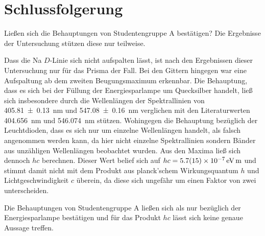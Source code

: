 \section{Schlussfolgerung}
	
	Ließen sich die Behauptungen von Studentengruppe A bestätigen?
	Die Ergebnisse der Untersuchung stützen diese nur teilweise.
	
	Dass die Na $D$-Linie sich nicht aufspalten lässt, ist nach den Ergebnissen dieser Untersuchung nur für das Prisma der Fall.
	Bei den Gittern hingegen war eine Aufspaltung ab dem zweiten Beugungsmaximum erkennbar.
	Die Behauptung, dass es sich bei der Füllung der Energiesparlampe um Quecksilber handelt, ließ sich insbesondere durch die Wellenlängen der Spektrallinien von \SI{405.81+-0.13}{\nano\meter} und \SI{547.08+-0.16}{\nano\meter} verglichen mit den Literaturwerten \SI{404.656}{\nano\meter} und \SI{546.074}{\nano\meter}\cite{NISTHg} stützen.
	Wohingegen die Behauptung bezüglich der Leuchtdioden, dass es sich nur um einzelne Wellenlängen handelt, als falsch angenommen werden kann, da hier nicht einzelne Spektrallinien sondern Bänder aus unzähligen Wellenlängen beobachtet wurden. 
	Aus den Maxima ließ sich dennoch $hc$ berechnen.
	Dieser Wert belief sich auf $hc = \SI{5,7+-1,5e-7}{\electronvolt\meter}$ und stimmt damit nicht mit dem Produkt aus planck'schem Wirkungsquantum $h$ und Lichtgeschwindigkeit $c$ überein, da diese sich ungefähr um einen Faktor von zwei unterscheiden.
	
	Die Behauptungen von Studentengruppe A ließen sich als nur bezüglich der Energiesparlampe bestätigen und für das Produkt $hc$ lässt sich keine genaue Aussage treffen.
	